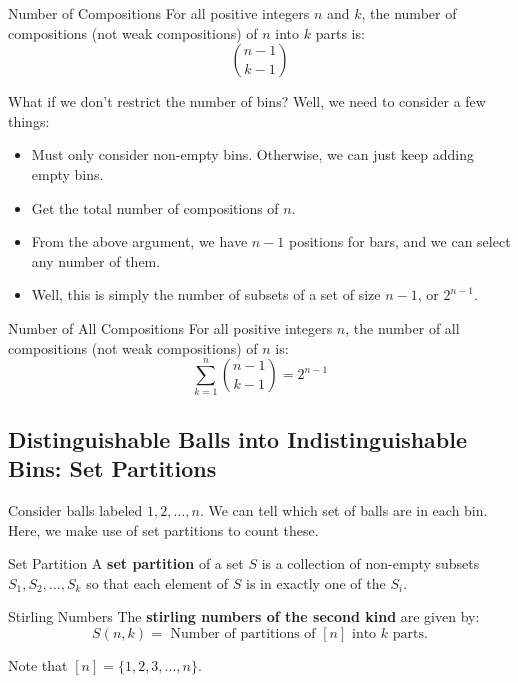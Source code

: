 \documentclass[letterpaper]{article}
\begin{document}
\begin{corollary}{Number of Compositions}{}
    For all positive integers $n$ and $k$, the number of compositions (not weak compositions) of $n$ into $k$ parts is:
    \[\binom{n - 1}{k - 1}\]
\end{corollary}

What if we don't restrict the number of bins? Well, we need to consider a few things: 
\begin{itemize}
    \item Must only consider non-empty bins. Otherwise, we can just keep adding empty bins.
    \item Get the total number of compositions of $n$. 
    \item From the above argument, we have $n - 1$ positions for bars, and we can select any number of them.
    \item Well, this is simply the number of subsets of a set of size $n - 1$, or $2^{n - 1}$.
\end{itemize}

\begin{corollary}{Number of All Compositions}{}
    For all positive integers $n$, the number of all compositions (not weak compositions) of $n$ is:
    \[\sum_{k = 1}^{n} \binom{n - 1}{k - 1} = 2^{n - 1}\]
\end{corollary}

\subsection{Distinguishable Balls into Indistinguishable Bins: Set Partitions}
Consider balls labeled $1, 2, \dots, n$. We can tell which set of balls are in each bin. Here, we make use of set partitions to count these. 

\begin{definition}{Set Partition}{}
    A \textbf{set partition} of a set $S$ is a collection of non-empty subsets $S_1, S_2, \dots, S_k$ so that each element of $S$ is in exactly one of the $S_i$. 
\end{definition}

\begin{definition}{Stirling Numbers}{}
    The \textbf{stirling numbers of the second kind} are given by:
    \[S(n, k) = \text{ Number of partitions of $[n]$ into $k$ parts.}\]
\end{definition}
Note that $[n] = \{1, 2, 3, ..., n\}$.
\end{document}

